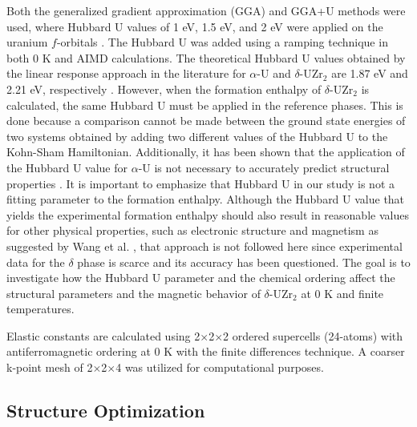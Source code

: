 \documentclass[preprint,12pt]{elsarticle}
\begin{document}
Both the generalized gradient approximation (GGA) \cite{perdew_generalized_1996} and GGA+U methods were used, where Hubbard U values of 1 eV, 1.5 eV, and 2 eV were applied on the uranium $f$-orbitals \cite{dudarev_effect_1997}. The Hubbard U was added using a ramping technique in both 0 K and AIMD calculations. The theoretical Hubbard U values obtained by the linear response approach in the literature for $\alpha$-U and $\delta$-UZr$_2$ are 1.87 eV and 2.21 eV, respectively \cite{xie_correlation_2013}. However, when the formation enthalpy of $\delta$-UZr$_2$ is calculated, the same Hubbard U must be applied in the reference phases. This is done because a comparison cannot be made between the ground state energies of two systems obtained by adding two different values of the Hubbard U to the Kohn-Sham Hamiltonian. Additionally, it has been shown that the application of the Hubbard U value for $\alpha$-U is not necessary to accurately predict structural properties \cite{beeler_first_2010,beeler_first_2013,beeler_determination_2021}. It is important to emphasize that Hubbard U in our study is not a fitting parameter to the formation enthalpy. Although the Hubbard U value that yields the experimental formation enthalpy should also result in reasonable values for other physical properties, such as electronic structure and magnetism as suggested by Wang et al. \cite{wang_oxidation_2006}, that approach is not followed here since experimental data for the $\delta$ phase is scarce and its accuracy has been questioned. The goal is to investigate how the Hubbard U parameter and the chemical ordering affect the structural parameters and the magnetic behavior of $\delta$-UZr$_2$ at 0 K and finite temperatures.

Elastic constants are calculated using 2$\times$2$\times$2 ordered supercells (24-atoms) with antiferromagnetic ordering at 0 K with the finite differences technique. A coarser k-point mesh of 2$\times$2$\times$4 was utilized for computational purposes. 



\subsection{Structure Optimization}
\end{document}
